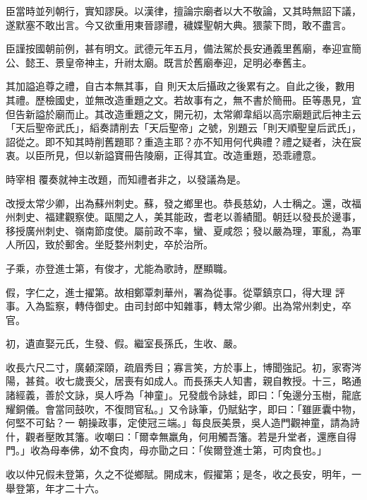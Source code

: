 \begin{pinyinscope}
 臣當時並列朝行，實知謬戾。以漢律，擅論宗廟者以大不敬論，又其時無詔下議，遂默塞不敢出言。今又欲重用東晉謬禮，穢媟聖朝大典。猥蒙下問，敢不盡言。



 臣謹按國朝前例，甚有明文。武德元年五月，備法駕於長安通義里舊廟，奉迎宣簡公、懿王、景皇帝神主，升祔太廟。既言於舊廟奉迎，足明必奉舊主。



 其加謚追尊之禮，自古本無其事，自
 則天太后攝政之後累有之。自此之後，數用其禮。歷檢國史，並無改造重題之文。若故事有之，無不書於簡冊。臣等愚見，宜但告新謚於廟而止。其改造重題之文，開元初，太常卿韋縚以高宗廟題武后神主云「天后聖帝武氏」，縚奏請削去「天后聖帝」之號，別題云「則天順聖皇后武氏」，詔從之。即不知其時削舊題耶？重造主耶？亦不知用何代典禮？禮之疑者，決在宸衷。以臣所見，但以新謚寶冊告陵廟，正得其宜。改造重題，恐乖禮意。



 時宰相
 覆奏就神主改題，而知禮者非之，以發議為是。



 改授太常少卿，出為蘇州刺史。蘇，發之鄉里也。恭長慈幼，人士稱之。還，改福州刺史、福建觀察使。甌閩之人，美其能政，耆老以善績聞。朝廷以發長於邊事，移授廣州刺史、嶺南節度使。屬前政不率，蠻、夏咸怨；發以嚴為理，軍亂，為軍人所囚，致於郵舍。坐貶婺州刺史，卒於治所。



 子乘，亦登進士第，有俊才，尤能為歌詩，歷顯職。



 假，字仁之，進士擢第。故相鄭覃刺華州，署為從事。從覃鎮京口，得大理
 評事。入為監察，轉侍御史。由司封郎中知雜事，轉太常少卿。出為常州刺史，卒官。



 初，遺直娶元氏，生發、假。繼室長孫氏，生收、嚴。



 收長六尺二寸，廣顙深頤，疏眉秀目；寡言笑，方於事上，博聞強記。初，家寄涔陽，甚貧。收七歲喪父，居喪有如成人。而長孫夫人知書，親自教授。十三，略通諸經義，善於文詠，吳人呼為「神童」。兄發戲令詠蛙，即曰：「兔邊分玉樹，龍底耀銅儀。會當同鼓吹，不復問官私。」又令詠筆，仍賦鉆字，即曰：「雖匪囊中物，何堅不可鉆？一
 朝操政事，定使冠三端。」每良辰美景，吳人造門觀神童，請為詩什，觀者壓敗其籓。收嘲曰：「爾幸無羸角，何用觸吾籓。若是升堂者，還應自得門。」收為母奉佛，幼不食肉，母亦勖之曰：「俟爾登進士第，可肉食也。」



 收以仲兄假未登第，久之不從鄉賦。開成末，假擢第；是冬，收之長安，明年，一舉登第，年才二十六。




\end{pinyinscope}
